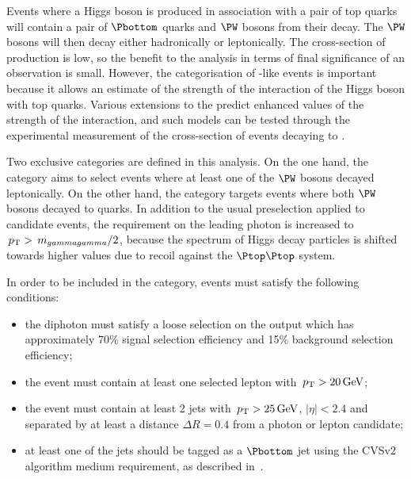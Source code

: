 Events where a Higgs boson is produced in association with a pair of top quarks will contain a pair of $\Pbottom$ quarks and $\PW$ bosons from their decay. The $\PW$ bosons will then decay either hadronically or leptonically. The cross-section of \ttH production is low, so the benefit to the analysis in terms of final significance of an observation is small. However, the categorisation of \ttH-like events is important because it allows an estimate of the strength of the interaction of the Higgs boson with top quarks. Various extensions to the \SM predict enhanced values of the strength of the \ttH interaction, and such models can be tested through the experimental measurement of the cross-section of \ttH events decaying to \Hgg.

Two exclusive \TTHTag categories are defined in this analysis. On the one hand, the \TTHLeptonicTag category aims to select \ttH events where at least one of the $\PW$ bosons decayed leptonically. On the other hand, the \TTHHadronicTag category targets events where both $\PW$ bosons decayed to quarks. In addition to the usual preselection applied to candidate events, the requirement on the leading photon \pT is increased to $\,p_\text{T}>\,m_{gammagamma}/2$, because the \pT spectrum of Higgs decay particles is shifted towards higher values due to recoil against the $\Ptop \Ptop$ system. %

In order to be included in the \TTHLeptonicTag category, events must satisfy the following conditions:
\begin{itemize}
\item the diphoton must satisfy a loose selection on the \DiPhoBdt output which has approximately 70\% signal selection efficiency and 15\% background selection efficiency; 
\item the event must contain at least one selected lepton with $\,p_\text{T}>20\,\text{Ge\hspace{-.08em}V}$; %
\item the event must contain at least 2 jets with $\,p_\text{T}>25\,\text{Ge\hspace{-.08em}V}$, $|\eta|<2.4$ and separated by at least a distance $\Delta R=0.4$ from a photon or lepton candidate;
\item at least one of the jets should be tagged as a $\Pbottom$ jet using the CVSv2 algorithm medium requirement, as described in~\cite{bjets}.
\end{itemize}

